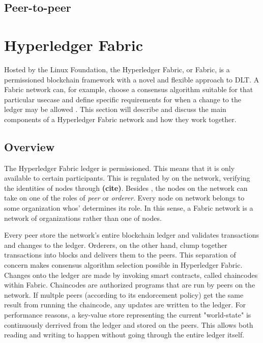 \documentclass[english, biblatex, digitaloutput]{kththesis}
\begin{document}



\subsection{Peer-to-peer}






\section{Hyperledger Fabric}

Hosted by the Linux Foundation\cite{linux-foundation_projects_nodate}, the Hyperledger Fabric, or Fabric, is a permissioned blockchain framework with a novel and flexible approach to \gls{DLT}. A Fabric network can, for example, choose a consensus algorithm suitable for that particular usecase and define specific requirements for when a change to the ledger may be allowed \cite{androulaki_hyperledger_2018}. This section will describe and discuss the main components of a Hyperledger Fabric network and how they work together.

\subsection{Overview}

The Hyperledger Fabric ledger is permissioned. This means that it is only available to certain participants. This is regulated by  on the network, verifying the identities of nodes through  \textbf{(cite)}. Besides , the nodes on the network can take on one of the roles of \textit{peer} or \textit{orderer}. Every node on network belongs to some organization whos'  determines its role. In this sense, a Fabric network is a network of organizations rather than one of nodes.

Every peer store the network's entire blockchain ledger and validates transactions and changes to the ledger. Orderers, on the other hand, clump together transactions into blocks and delivers them to the peers. This separation of concern makes consensus algorithm selection possible in Hyperledger Fabric. Changes onto the ledger are made by invoking smart contracts, called chaincodes within Fabric. Chaincodes are authorized programs that are run by peers on the network. If multple peers (according to its endorcement policy) get the same result from running the chaincode, any updates are written to the ledger. For performance reasons, a key-value store representing the current "world-state" is continuously derrived from the ledger and stored on the peers. This allows both reading and writing to happen without going through the entire ledger itself.
\end{document}
